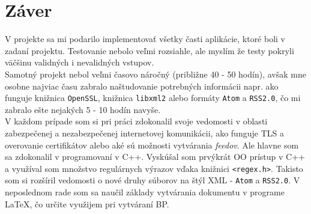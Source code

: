 \documentclass[a4paper, 11pt]{article}
\begin{document}
    \section{Záver}
    \label{endeSchluss}
    V projekte sa mi podarilo implementovať všetky časti aplikácie, ktoré boli v zadaní projektu. Testovanie nebolo veľmi rozsiahle, ale myslím že testy pokryli väčšinu validných i nevalidných vstupov. \\
    
     Samotný projekt nebol veľmi časovo náročný (približne 40 - 50 hodín), avšak mne osobne najviac času zabralo naštudovanie potrebných informácii napr. ako funguje knižnica \texttt{OpenSSL}, knižnica \texttt{libxml2} alebo formáty \texttt{Atom} a \texttt{RSS2.0}, čo mi zabralo ešte nejakých 5 - 10 hodín navyše. \\

    V každom prípade som si pri práci zdokonalil svoje vedomosti v oblasti zabezpečenej a nezabezpečenej internetovej komunikácii, ako funguje TLS a overovanie certifikátov alebo aké sú možnosti vytvárania \textit{feedov}. Ale hlavne som sa zdokonalil v programovaní v C++. Vyskúšal som prvýkrát OO prístup v C++ a využíval som množstvo regulárnych výrazov vďaka knižnici \texttt{<regex.h>}. Takisto som si rozšíril vedomosti o nové druhy súborov na štýl XML - \texttt{Atom} a \texttt{RSS2.0}. V neposlednom rade som sa naučil základy vytvárania dokumentu v programe \LaTeX, čo určite využijem pri vytváraní BP.

    \clearpage
    \renewcommand{\refname}{Zdroje}
    
    
 
\end{document}
